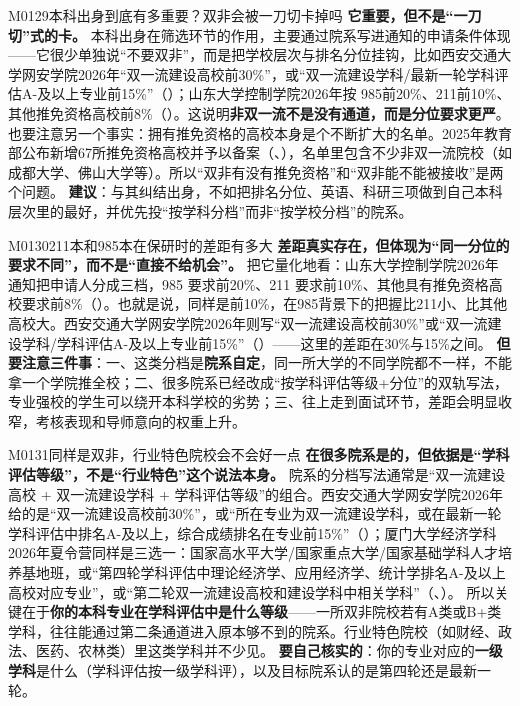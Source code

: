 \begin{qa}{M0129}{本科出身到底有多重要？双非会被一刀切卡掉吗}
\textbf{它重要，但不是“一刀切”式的卡。} 本科出身在筛选环节的作用，主要通过院系写进通知的申请条件体现——它很少单独说“不要双非”，而是把学校层次与排名分位挂钩，比如西安交通大学网安学院2026年“双一流建设高校前30\%”，或“双一流建设学科/最新一轮学科评估A-及以上专业前15\%”（）；山东大学控制学院2026年按 985前20\%、211前10\%、其他推免资格高校前8\%（）。这说明\textbf{非双一流不是没有通道，而是分位要求更严}。
也要注意另一个事实：拥有推免资格的高校本身是个不断扩大的名单。2025年教育部公布新增67所推免资格高校并予以备案（、），名单里包含不少非双一流院校（如成都大学、佛山大学等）。所以“双非有没有推免资格”和“双非能不能被接收”是两个问题。
\textbf{建议}：与其纠结出身，不如把排名分位、英语、科研三项做到自己本科层次里的最好，并优先投“按学科分档”而非“按学校分档”的院系。
\end{qa}

\begin{qa}{M0130}{211本和985本在保研时的差距有多大}
\textbf{差距真实存在，但体现为“同一分位的要求不同”，而不是“直接不给机会”。}
把它量化地看：山东大学控制学院2026年通知把申请人分成三档，985 要求前20\%、211 要求前10\%、其他具有推免资格高校要求前8\%（）。也就是说，同样是前10\%，在985背景下的把握比211小、比其他高校大。西安交通大学网安学院2026年则写“双一流建设高校前30\%”或“双一流建设学科/学科评估A-及以上专业前15\%”（）——这里的差距在30\%与15\%之间。
\textbf{但要注意三件事}：一、这类分档是\textbf{院系自定}，同一所大学的不同学院都不一样，不能拿一个学院推全校；二、很多院系已经改成“按学科评估等级+分位”的双轨写法，专业强校的学生可以绕开本科学校的劣势；三、往上走到面试环节，差距会明显收窄，考核表现和导师意向的权重上升。
\end{qa}

\begin{qa}{M0131}{同样是双非，行业特色院校会不会好一点}
\textbf{在很多院系是的，但依据是“学科评估等级”，不是“行业特色”这个说法本身。}
院系的分档写法通常是“双一流建设高校 + 双一流建设学科 + 学科评估等级”的组合。西安交通大学网安学院2026年给的是“双一流建设高校前30\%”，或“所在专业为双一流建设学科，或在最新一轮学科评估中排名A-及以上，综合成绩排名在专业前15\%”（）；厦门大学经济学科2026年夏令营同样是三选一：国家高水平大学/国家重点大学/国家基础学科人才培养基地班，或“第四轮学科评估中理论经济学、应用经济学、统计学排名A-及以上高校对应专业”，或“第二轮双一流建设高校和建设学科中相关学科”（、）。
所以关键在于\textbf{你的本科专业在学科评估中是什么等级}——一所双非院校若有A类或B+类学科，往往能通过第二条通道进入原本够不到的院系。行业特色院校（如财经、政法、医药、农林类）里这类学科并不少见。
\textbf{要自己核实的}：你的专业对应的\textbf{一级学科}是什么（学科评估按一级学科评），以及目标院系认的是第四轮还是最新一轮。
\end{qa}

